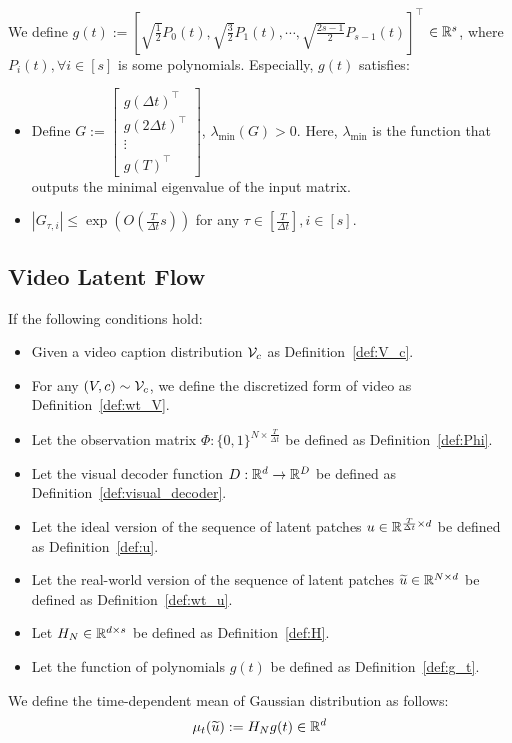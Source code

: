 \begin{definition}\label{def:g_t}
    We define $g(t) := [\sqrt{\frac{1}{2}} P_0(t), \sqrt{\frac{3}{2}} P_1(t), \cdots, \sqrt{\frac{2s-1}{2}} P_{s-1}(t)]^\top $ $\in \mathbb{R}^{s} $, where$ P_i(t), \forall i \in [s]$ is some polynomials. Especially, $g(t)$ satisfies:
    \begin{itemize}
        \item Define $G := \begin{bmatrix}
            g(\Delta t)^\top \\
            g(2 \Delta t)^\top \\
            \vdots \\
            g(T)^\top
        \end{bmatrix}$, $\lambda_{\min} (G) > 0$. Here, $\lambda_{\min}$ is the function that outputs the minimal eigenvalue of the input matrix.
        \item $|G_{\tau, i}| \leq \exp(O(\frac{T}{\Delta t}s))$ for any $\tau \in [\frac{T}{ \Delta t}], i \in [s]$.
    \end{itemize}
\end{definition}

\subsection{Video Latent Flow} \label{sub:app:vlf}

\begin{definition}\label{def:mu}
    If the following conditions hold:
    \begin{itemize}
        \item Given a video caption distribution ${\cal V}_c$ as Definition~\ref{def:V_c}.
        \item For any $(V, c) \sim {\cal V}_c$, we define the discretized form of video as Definition~\ref{def:wt_V}.
        \item Let the observation matrix $\Phi: \{0, 1\}^{N \times \frac{T}{\Delta t}}$ be defined as Definition~\ref{def:Phi}.
        \item Let the visual decoder function $D: \mathbb{R}^d \rightarrow \mathbb{R}^D$ be defined as Definition~\ref{def:visual_decoder}.
        \item Let the ideal version of the sequence of latent patches $u \in \mathbb{R}^{\frac{T}{\Delta t} \times d}$ be defined as Definition~\ref{def:u}.
        \item Let the real-world version of the sequence of latent patches $\widetilde{u} \in \mathbb{R}^{N \times d}$ be defined as Definition~\ref{def:wt_u}.
        \item Let $H_N \in \mathbb{R}^{d \times s}$ be defined as Definition~\ref{def:H}.
        \item Let the function of polynomials $g(t)$ be defined as Definition~\ref{def:g_t}.
    \end{itemize}
    We define the time-dependent mean of Gaussian distribution as follows:
    \begin{align*}
        \mu_t(\widetilde{u}) := H_N g(t) \in \mathbb{R}^d
    \end{align*}
\end{definition}


